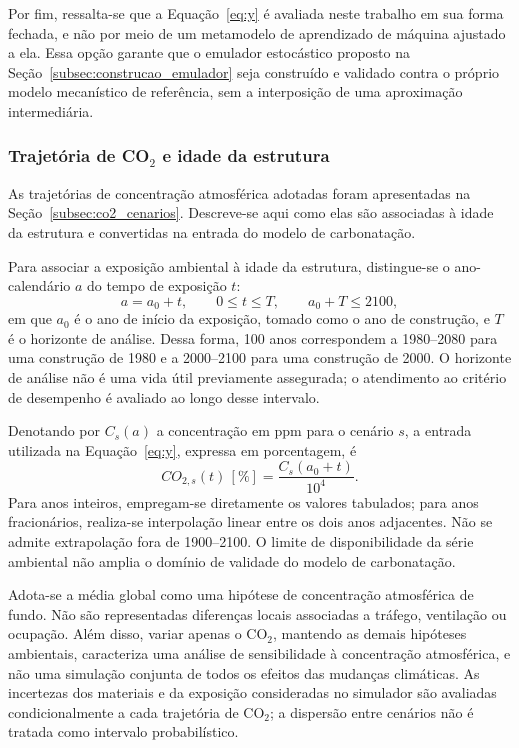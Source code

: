 Por fim, ressalta-se que a Equação~\eqref{eq:y} é avaliada neste trabalho em sua forma fechada, e não por meio de um metamodelo de aprendizado de máquina ajustado a ela. Essa opção garante que o emulador estocástico proposto na Seção~\ref{subsec:construcao_emulador} seja construído e validado contra o próprio modelo mecanístico de referência, sem a interposição de uma aproximação intermediária.

\subsubsection{Trajet\'oria de \texorpdfstring{CO$_2$}{CO2} e idade da estrutura}
\label{subsec:co2}

As trajetórias de concentração atmosférica adotadas foram apresentadas na Seção~\ref{subsec:co2_cenarios}. Descreve-se aqui como elas são associadas à idade da estrutura e convertidas na entrada do modelo de carbonatação.

Para associar a exposição ambiental à idade da estrutura, distingue-se o ano-calendário $a$ do tempo de exposição $t$:
\begin{equation}
    a = a_0 + t, \qquad 0 \leq t \leq T, \qquad a_0+T \leq 2100,
    \label{eq:co2_calendar_age}
\end{equation}
em que $a_0$ é o ano de início da exposição, tomado como o ano de construção, e $T$ é o horizonte de análise. Dessa forma, 100 anos correspondem a 1980--2080 para uma construção de 1980 e a 2000--2100 para uma construção de 2000. O horizonte de análise não é uma vida útil previamente assegurada; o atendimento ao critério de desempenho é avaliado ao longo desse intervalo.

Denotando por $C_s(a)$ a concentração em ppm para o cenário $s$, a entrada utilizada na Equação~\eqref{eq:y}, expressa em porcentagem, é
\begin{equation}
    CO_{2,s}(t)\,[\%] = \frac{C_s(a_0+t)}{10^4}.
    \label{eq:co2_conversion}
\end{equation}
Para anos inteiros, empregam-se diretamente os valores tabulados; para anos fracionários, realiza-se interpolação linear entre os dois anos adjacentes. Não se admite extrapolação fora de 1900--2100. O limite de disponibilidade da série ambiental não amplia o domínio de validade do modelo de carbonatação.

Adota-se a média global como uma hipótese de concentração atmosférica de fundo. Não são representadas diferenças locais associadas a tráfego, ventilação ou ocupação. Além disso, variar apenas o CO$_2$, mantendo as demais hipóteses ambientais, caracteriza uma análise de sensibilidade à concentração atmosférica, e não uma simulação conjunta de todos os efeitos das mudanças climáticas. As incertezas dos materiais e da exposição consideradas no simulador são avaliadas condicionalmente a cada trajetória de CO$_2$; a dispersão entre cenários não é tratada como intervalo probabilístico.

